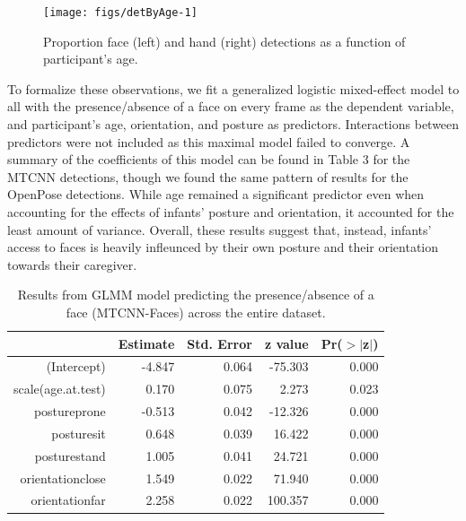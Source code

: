 \documentclass[10pt, letterpaper]{article}
\newenvironment{CodeChunk}{}{}
\begin{document}
\begin{CodeChunk}
\begin{figure}[h]

{\centering \texttt{[image: figs/detByAge-1]} 

}

\caption[Proportion face (left) and hand (right) detections as a function of participant's age]{Proportion face (left) and hand (right) detections as a function of participant's age.}\label{fig:detByAge}
\end{figure}
\end{CodeChunk}

To formalize these observations, we fit a generalized logistic
mixed-effect model to all with the presence/absence of a face on every
frame as the dependent variable, and participant's age, orientation, and
posture as predictors. Interactions between predictors were not included
as this maximal model failed to converge. A summary of the coefficients
of this model can be found in Table 3 for the MTCNN detections, though
we found the same pattern of results for the OpenPose detections. While
age remained a significant predictor even when accounting for the
effects of infants' posture and orientation, it accounted for the least
amount of variance. Overall, these results suggest that, instead,
infants' access to faces is heavily infleunced by their own posture and
their orientation towards their caregiver.

\begin{table}[H]
\centering
\begin{tabular}{rrrrr}
  \hline
 & Estimate & Std. Error & z value & Pr($>$$|$z$|$) \\ 
  \hline
(Intercept) & -4.847 & 0.064 & -75.303 & 0.000 \\ 
  scale(age.at.test) & 0.170 & 0.075 & 2.273 & 0.023 \\ 
  postureprone & -0.513 & 0.042 & -12.326 & 0.000 \\ 
  posturesit & 0.648 & 0.039 & 16.422 & 0.000 \\ 
  posturestand & 1.005 & 0.041 & 24.721 & 0.000 \\ 
  orientationclose & 1.549 & 0.022 & 71.940 & 0.000 \\ 
  orientationfar & 2.258 & 0.022 & 100.357 & 0.000 \\ 
   \hline
\end{tabular}
\caption{Results from GLMM model predicting the presence/absence of a face (MTCNN-Faces) across the entire dataset.} 
\end{table}
\end{document}
